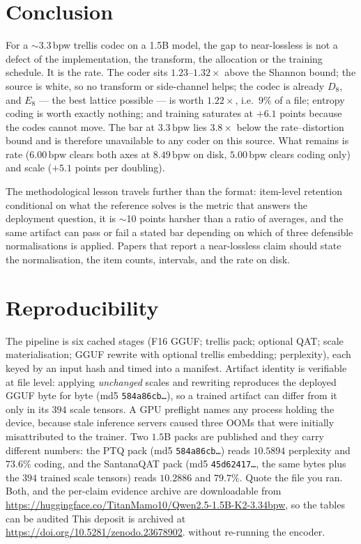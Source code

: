 \documentclass[11pt,a4paper]{article}
\newcommand{\bpw}{\,\mathrm{bpw}}
\begin{document}
\section{Conclusion}

For a $\sim$3.3\,bpw trellis codec on a 1.5B model, the gap to near-lossless is not a defect of
the implementation, the transform, the allocation or the training schedule. It is the rate. The
coder sits $1.23$--$1.32\times$ above the Shannon bound; the source is white, so no
transform or side-channel helps; the codec is already $D_8$, and $E_8$ --- the best lattice
possible --- is worth $1.22\times$, i.e.\ $9\%$ of a file; entropy coding is worth exactly
nothing; and training saturates at $+6.1$ points because the codes cannot move. The bar at
$3.3\bpw$ lies $3.8\times$ below the rate--distortion bound and is therefore unavailable to any
coder on this source. What remains is rate ($6.00\bpw$ clears both axes at $8.49\bpw$ on disk,
$5.00\bpw$ clears coding only) and scale ($+5.1$ points per doubling).

The methodological lesson travels further than the format: item-level retention conditional on
what the reference solves is the metric that answers the deployment question, it is $\sim$10
points harsher than a ratio of averages, and the same artifact can pass or fail a stated bar
depending on which of three defensible normalisations is applied. Papers that report a
near-lossless claim should state the normalisation, the item counts, intervals, and the rate on
disk.

\appendix
\section{Reproducibility}
The pipeline is six cached stages (F16 GGUF; trellis pack; optional QAT; scale materialisation;
GGUF rewrite with optional trellis embedding; perplexity), each keyed by an input hash and timed
into a manifest. Artifact identity is verifiable at file level: applying \emph{unchanged} scales
and rewriting reproduces the deployed GGUF byte for byte (md5 \texttt{584a86cb\ldots}), so a
trained artifact can differ from it only in its $394$ scale tensors. A GPU preflight names any
process holding the device, because stale inference servers caused three OOMs that were initially
misattributed to the trainer. Two $1.5$B packs are published and they carry different numbers: the PTQ
pack (md5 \texttt{584a86cb\ldots}) reads $10.5894$ perplexity and $73.6\%$ coding, and the SantanaQAT pack
(md5 \texttt{45d62417\ldots}, the same bytes plus the $394$ trained scale tensors) reads $10.2886$ and
$79.7\%$. Quote the file you ran. Both, and the
per-claim evidence archive are downloadable from
\url{https://huggingface.co/TitanMamo10/Qwen2.5-1.5B-K2-3.34bpw}, so the tables can be audited
This deposit is archived at \url{https://doi.org/10.5281/zenodo.23678902}.
without re-running the encoder.
\end{document}
